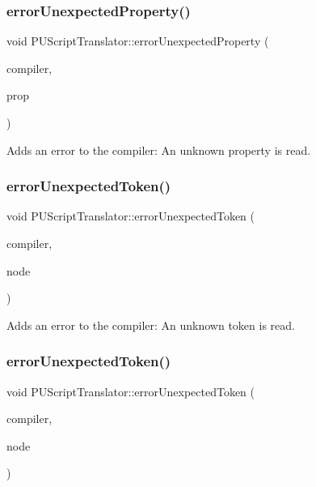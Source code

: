 \subsubsection{\texorpdfstring{error\+Unexpected\+Property()}{errorUnexpectedProperty()}\hspace{0.1cm}{\footnotesize\ttfamily [2/2]}}
{\footnotesize\ttfamily void P\+U\+Script\+Translator\+::error\+Unexpected\+Property (\begin{DoxyParamCaption}\item[{\hyperlink{classPUScriptCompiler}{P\+U\+Script\+Compiler} $\ast$}]{compiler,  }\item[{\hyperlink{classPUPropertyAbstractNode}{P\+U\+Property\+Abstract\+Node} $\ast$}]{prop }\end{DoxyParamCaption})}

Adds an error to the compiler\+: An unknown property is read. \mbox{\label{classPUScriptTranslator_ad17bf5fd56218fc667642122a100ba3e}} 
\subsubsection{\texorpdfstring{error\+Unexpected\+Token()}{errorUnexpectedToken()}\hspace{0.1cm}{\footnotesize\ttfamily [1/2]}}
{\footnotesize\ttfamily void P\+U\+Script\+Translator\+::error\+Unexpected\+Token (\begin{DoxyParamCaption}\item[{\hyperlink{classPUScriptCompiler}{P\+U\+Script\+Compiler} $\ast$}]{compiler,  }\item[{\hyperlink{classPUAbstractNode}{P\+U\+Abstract\+Node} $\ast$}]{node }\end{DoxyParamCaption})}

Adds an error to the compiler\+: An unknown token is read. \mbox{\label{classPUScriptTranslator_ad17bf5fd56218fc667642122a100ba3e}} 
\subsubsection{\texorpdfstring{error\+Unexpected\+Token()}{errorUnexpectedToken()}\hspace{0.1cm}{\footnotesize\ttfamily [2/2]}}
{\footnotesize\ttfamily void P\+U\+Script\+Translator\+::error\+Unexpected\+Token (\begin{DoxyParamCaption}\item[{\hyperlink{classPUScriptCompiler}{P\+U\+Script\+Compiler} $\ast$}]{compiler,  }\item[{\hyperlink{classPUAbstractNode}{P\+U\+Abstract\+Node} $\ast$}]{node }\end{DoxyParamCaption})}

